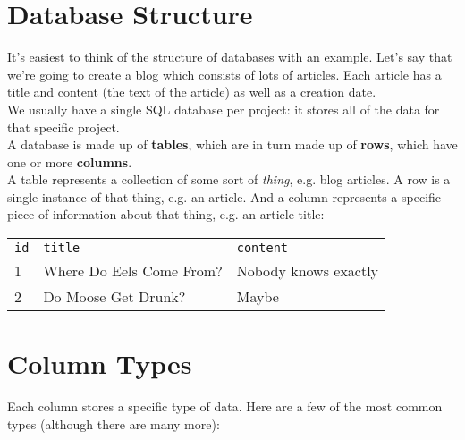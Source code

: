 \section{Database Structure}

It's easiest to think of the structure of databases with an example. Let's say that we're going to create a blog which consists of lots of articles. Each article has a title and content (the text of the article) as well as a creation date.
\\

We usually have a single SQL database per project: it stores all of the data for that specific project.
\\

A database is made up of \textbf{tables}, which are in turn made up of \textbf{rows}, which have one or more \textbf{columns}.
\\

A table represents a collection of some sort of \textit{thing}, e.g. blog articles. A row is a single instance of that thing, e.g. an article. And a column represents a specific piece of information about that thing, e.g. an article title:
\\

\begin{tabu}{l l X}
    \texttt{id} & \texttt{title}            & \texttt{content} \\
    1           & Where Do Eels Come From?  & Nobody knows exactly  \\
    2           & Do Moose Get Drunk?       & Maybe \\
\end{tabu}

\par\bigskip


\section{Column Types}

Each column stores a specific type of data. Here are a few of the most common types (although there are many more):
\\

